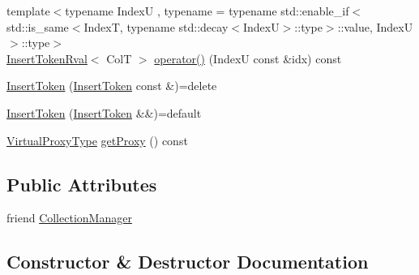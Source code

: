 \begin{DoxyCompactItemize}
\item 
{\footnotesize template$<$typename IndexU , typename  = typename std\+::enable\+\_\+if$<$      std\+::is\+\_\+same$<$\+Index\+T, typename std\+::decay$<$\+Index\+U$>$\+::type$>$\+::value, Index\+U    $>$\+::type$>$ }\\\hyperlink{structvt_1_1vrt_1_1collection_1_1_insert_token_rval}{Insert\+Token\+Rval}$<$ ColT $>$ \hyperlink{structvt_1_1vrt_1_1collection_1_1_insert_token_a3f68c2bd0aecfe50588f8cfc14ecfa4f}{operator()} (IndexU const \&idx) const
\item 
\hyperlink{structvt_1_1vrt_1_1collection_1_1_insert_token_a4adbc8942df683af9d99216c7d2a40d1}{Insert\+Token} (\hyperlink{structvt_1_1vrt_1_1collection_1_1_insert_token}{Insert\+Token} const \&)=delete
\item 
\hyperlink{structvt_1_1vrt_1_1collection_1_1_insert_token_a69f1ea2a33fab61d960c39da57fc0486}{Insert\+Token} (\hyperlink{structvt_1_1vrt_1_1collection_1_1_insert_token}{Insert\+Token} \&\&)=default
\item 
\hyperlink{namespacevt_a1b417dd5d684f045bb58a0ede70045ac}{Virtual\+Proxy\+Type} \hyperlink{structvt_1_1vrt_1_1collection_1_1_insert_token_a41b45da02fd476f5a5a1a57f69f7b17e}{get\+Proxy} () const
\end{DoxyCompactItemize}
\subsection*{Public Attributes}
\begin{DoxyCompactItemize}
\item 
friend \hyperlink{structvt_1_1vrt_1_1collection_1_1_insert_token_a42b6dc06fe8e840dd6ad6c9254b937c3}{Collection\+Manager}
\end{DoxyCompactItemize}


\subsection{Constructor \& Destructor Documentation}
\mbox{\label{structvt_1_1vrt_1_1collection_1_1_insert_token_a387506c3e013a275665e644d99b75577}} 

